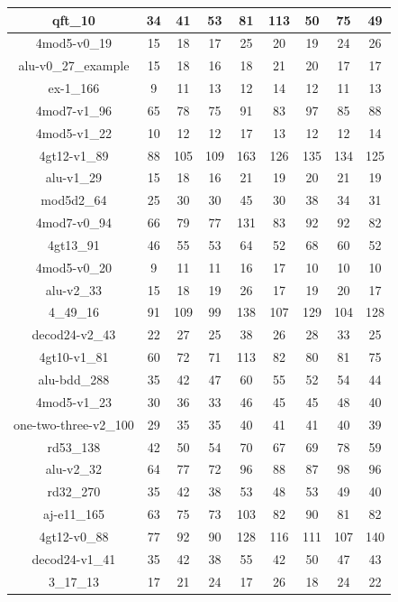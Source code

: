 \begin{longtable}[c]{|c|c|c|c|c|c|c|c|c|}
qft\_10 & 34 & 41 & 53 & 81 & 113 & 50 & 75 & 49 \\ \hline
4mod5-v0\_19 & 15 & 18 & 17 & 25 & 20 & 19 & 24 & 26 \\ \hline
alu-v0\_27\_example & 15 & 18 & 16 & 18 & 21 & 20 & 17 & 17 \\ \hline
ex-1\_166 & 9 & 11 & 13 & 12 & 14 & 12 & 11 & 13 \\ \hline
4mod7-v1\_96 & 65 & 78 & 75 & 91 & 83 & 97 & 85 & 88 \\ \hline
4mod5-v1\_22 & 10 & 12 & 12 & 17 & 13 & 12 & 12 & 14 \\ \hline
4gt12-v1\_89 & 88 & 105 & 109 & 163 & 126 & 135 & 134 & 125 \\ \hline
alu-v1\_29 & 15 & 18 & 16 & 21 & 19 & 20 & 21 & 19 \\ \hline
mod5d2\_64 & 25 & 30 & 30 & 45 & 30 & 38 & 34 & 31 \\ \hline
4mod7-v0\_94 & 66 & 79 & 77 & 131 & 83 & 92 & 92 & 82 \\ \hline
4gt13\_91 & 46 & 55 & 53 & 64 & 52 & 68 & 60 & 52 \\ \hline
4mod5-v0\_20 & 9 & 11 & 11 & 16 & 17 & 10 & 10 & 10 \\ \hline
alu-v2\_33 & 15 & 18 & 19 & 26 & 17 & 19 & 20 & 17 \\ \hline
4\_49\_16 & 91 & 109 & 99 & 138 & 107 & 129 & 104 & 128 \\ \hline
decod24-v2\_43 & 22 & 27 & 25 & 38 & 26 & 28 & 33 & 25 \\ \hline
4gt10-v1\_81 & 60 & 72 & 71 & 113 & 82 & 80 & 81 & 75 \\ \hline
alu-bdd\_288 & 35 & 42 & 47 & 60 & 55 & 52 & 54 & 44 \\ \hline
4mod5-v1\_23 & 30 & 36 & 33 & 46 & 45 & 45 & 48 & 40 \\ \hline
one-two-three-v2\_100 & 29 & 35 & 35 & 40 & 41 & 41 & 40 & 39 \\ \hline
rd53\_138 & 42 & 50 & 54 & 70 & 67 & 69 & 78 & 59 \\ \hline
alu-v2\_32 & 64 & 77 & 72 & 96 & 88 & 87 & 98 & 96 \\ \hline
rd32\_270 & 35 & 42 & 38 & 53 & 48 & 53 & 49 & 40 \\ \hline
aj-e11\_165 & 63 & 75 & 73 & 103 & 82 & 90 & 81 & 82 \\ \hline
4gt12-v0\_88 & 77 & 92 & 90 & 128 & 116 & 111 & 107 & 140 \\ \hline
decod24-v1\_41 & 35 & 42 & 38 & 55 & 42 & 50 & 47 & 43 \\ \hline
3\_17\_13 & 17 & 21 & 24 & 17 & 26 & 18 & 24 & 22 \\ \hline

\end{longtable}
